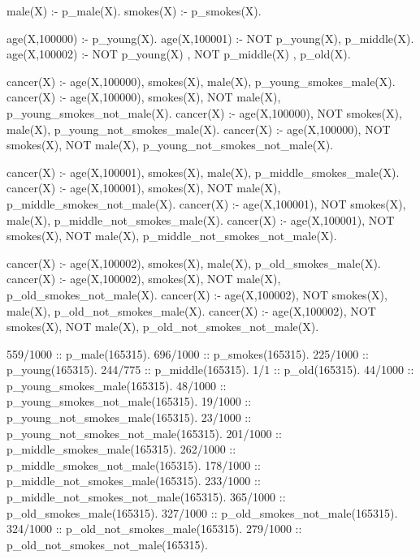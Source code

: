 \documentclass[german,version-2020-11]{uzl-thesis}
\begin{document}
\begin{Pseudocode}[caption={\textit{beliefProgram.pbl} für Krebs in MIMIC-III}, label={code:beliefprogrammimic}, numbers=left]
male(X) :- p_male(X). 
smokes(X) :- p_smokes(X).

age(X,100000) :- p_young(X).
age(X,100001) :- NOT p_young(X), p_middle(X).
age(X,100002) :- NOT p_young(X) , NOT p_middle(X) , p_old(X).

cancer(X) :- age(X,100000), smokes(X), male(X), p_young_smokes_male(X).
cancer(X) :- age(X,100000), smokes(X), NOT male(X), p_young_smokes_not_male(X).
cancer(X) :- age(X,100000), NOT smokes(X), male(X), p_young_not_smokes_male(X).
cancer(X) :- age(X,100000), NOT smokes(X), NOT male(X), p_young_not_smokes_not_male(X).

cancer(X) :- age(X,100001), smokes(X), male(X), p_middle_smokes_male(X).
cancer(X) :- age(X,100001), smokes(X), NOT male(X), p_middle_smokes_not_male(X).
cancer(X) :- age(X,100001), NOT smokes(X), male(X), p_middle_not_smokes_male(X).
cancer(X) :- age(X,100001), NOT smokes(X), NOT male(X), p_middle_not_smokes_not_male(X).

cancer(X) :- age(X,100002), smokes(X), male(X), p_old_smokes_male(X).
cancer(X) :- age(X,100002), smokes(X), NOT male(X), p_old_smokes_not_male(X).
cancer(X) :- age(X,100002), NOT smokes(X), male(X), p_old_not_smokes_male(X).
cancer(X) :- age(X,100002), NOT smokes(X), NOT male(X), p_old_not_smokes_not_male(X).

559/1000 :: p_male(165315).
696/1000 :: p_smokes(165315).
225/1000 :: p_young(165315).
244/775 :: p_middle(165315).
1/1 :: p_old(165315).
44/1000 :: p_young_smokes_male(165315).
48/1000 :: p_young_smokes_not_male(165315).
19/1000 :: p_young_not_smokes_male(165315).
23/1000 :: p_young_not_smokes_not_male(165315).
201/1000 :: p_middle_smokes_male(165315).
262/1000 :: p_middle_smokes_not_male(165315).
178/1000 :: p_middle_not_smokes_male(165315).
233/1000 :: p_middle_not_smokes_not_male(165315).
365/1000 :: p_old_smokes_male(165315).
327/1000 :: p_old_smokes_not_male(165315).
324/1000 :: p_old_not_smokes_male(165315).
279/1000 :: p_old_not_smokes_not_male(165315).
\end{Pseudocode}
\end{document}
